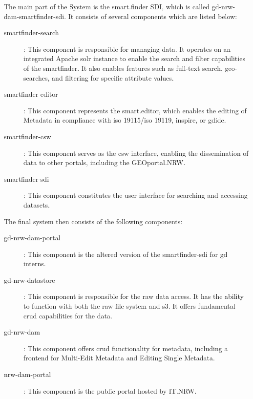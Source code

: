 \documentclass[11pt, titlepage, a4paper]{article}
\begin{document}
The main part of the System is the smart.finder SDI, which is called gd-nrw-dam-smartfinder-sdi. It consists of several components which are listed below:
\begin{description}
    \item[smartfinder-search]: This component is responsible for managing data. It operates on an integrated Apache \Gls{solr} instance to enable the search and filter capabilities of the smartfinder. It also enables features such as full-text search, geo-searches, and filtering for specific attribute values.
    \item[smartfinder-editor]: This component represents the smart.editor, which enables the editing of Metadata in compliance with \gls{iso} 19115/\gls{iso} 19119, \gls{inspire}, or \gls{gdide}.
    \item[smartfinder-csw]: This component serves as the \gls{csw} interface, enabling the dissemination of data to other portals, including the GEOportal.NRW.
    \item[smartfinder-sdi]: This component constitutes the user interface for searching and accessing datasets.

\end{description}
The final system then consists of the following components:
\begin{description}
    \item[gd-nrw-dam-portal]: This component is the altered version of the smartfinder-sdi for \gls{gd} interns.
    \item[gd-nrw-datastore]: This component is responsible for the raw data access. It has the ability to function with both the raw file system and \gls{s3}. It offers fundamental \gls{crud} capabilities for the data.
    \item[gd-nrw-dam]:  This component offers \gls{crud} functionality for metadata, including a frontend for Multi-Edit Metadata and Editing Single Metadata. %
    \item[nrw-dam-portal]: This component is the public portal hosted by IT.NRW.

\end{description}
\end{document}
